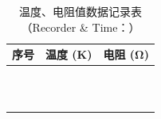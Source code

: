 \begin{table}[h!]
	\centering
	\caption{温度、电阻值数据记录表（Recorder \& Time：\hspace{4cm}）}
	\label{tab:TR}
		\begin{tabular}{|c|c|c|}
			\hline
			序号 & 温度 (K) & 电阻 (Ω) \\
			\hline
			\hspace{5cm} & \hspace{5cm} & \hspace{5cm} \\ 
			\hline
			 \hspace{5cm} & \hspace{5cm} & \hspace{5cm} \\ 
			\hline
			\hspace{5cm} & \hspace{5cm} & \hspace{5cm} \\ 
			\hline
			\hspace{5cm} & \hspace{5cm} & \hspace{5cm} \\ 
			\hline
			\hspace{5cm} & \hspace{5cm} & \hspace{5cm} \\ 
			\hline
			\hspace{5cm} & \hspace{5cm} & \hspace{5cm} \\ 
			\hline
			\hspace{5cm} & \hspace{5cm} & \hspace{5cm} \\ 
			\hline
			\hspace{5cm} & \hspace{5cm} & \hspace{5cm} \\ 
			\hline
			\hspace{5cm} & \hspace{5cm} & \hspace{5cm} \\ 
			\hline
			\hspace{5cm} & \hspace{5cm} & \hspace{5cm} \\ 
			\hline
			\hspace{5cm} & \hspace{5cm} & \hspace{5cm} \\ 
			\hline
		\end{tabular}
\end{table}

